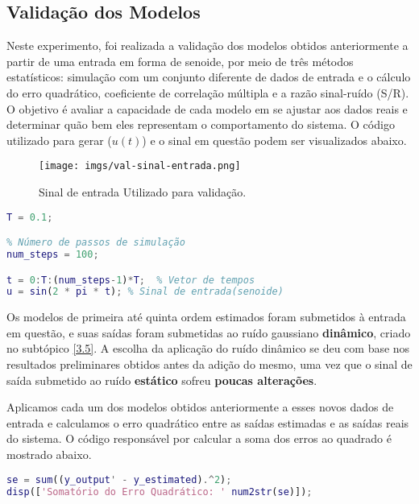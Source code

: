 \documentclass[a4paper,12pt]{article}
\begin{document}
\subsection{Validação dos Modelos}\label{3.6}

Neste experimento, foi realizada a validação dos modelos obtidos anteriormente a partir de uma entrada em forma de senoide, por meio de três métodos estatísticos: simulação com um conjunto diferente de dados de entrada e o cálculo do erro quadrático, coeficiente de correlação múltipla e a razão sinal-ruído (S/R). O objetivo é avaliar a capacidade de cada modelo em se ajustar aos dados reais e determinar quão bem eles representam o comportamento do sistema. O código utilizado para gerar ($u(t)$) e o sinal em questão podem ser visualizados abaixo.

\begin{figure}[h!]\label{validacao-sinal}
  \centering
  \texttt{[image: imgs/val-sinal-entrada.png]}
  \caption{Sinal de entrada Utilizado para validação.}
\end{figure}

\begin{lstlisting}[language=Matlab, caption=$u(t)$ para validação]
% Tempo de amostragem
T = 0.1;

% Número de passos de simulação
num_steps = 100;

t = 0:T:(num_steps-1)*T;  % Vetor de tempos
u = sin(2 * pi * t); % Sinal de entrada(senoide)
\end{lstlisting}

Os modelos de primeira até quinta ordem estimados foram submetidos à entrada em questão, e suas saídas foram submetidas ao ruído gaussiano \textbf{dinâmico}, criado no subtópico \ref{3.5}. A escolha da aplicação do ruído dinâmico se deu com base nos resultados preliminares obtidos antes da adição do mesmo, uma vez que o sinal de saída submetido ao ruído \textbf{estático} sofreu \textbf{poucas alterações}. 

Aplicamos cada um dos modelos obtidos anteriormente a esses novos dados de entrada e calculamos o erro quadrático entre as saídas estimadas e as saídas reais do sistema. O código responsável por calcular a soma dos erros ao quadrado é mostrado abaixo.
\begin{lstlisting}[language=Matlab, caption=Calculo do somatório dos erros ao quadrado.]
% Cálculo do somatório do erro quadrático
se = sum((y_output' - y_estimated).^2);
disp(['Somatório do Erro Quadrático: ' num2str(se)]);
\end{lstlisting}
\end{document}
